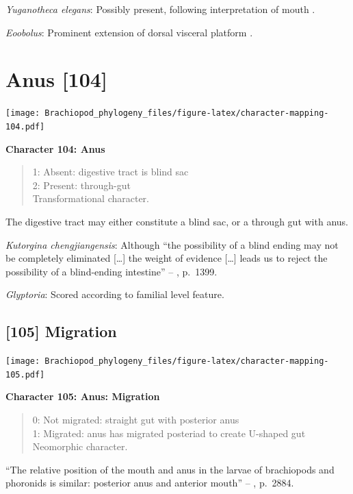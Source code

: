 \documentclass[]{book}
\theoremstyle{definition}
\theoremstyle{definition}
\theoremstyle{definition}
\theoremstyle{remark}
\begin{document}
\emph{Yuganotheca elegans}: Possibly present, following interpretation
of mouth \citep[see fig. 2c, d in][]{Zhang2014Anearly}.

\emph{Eoobolus}: Prominent extension of dorsal visceral platform
\citep{Balthasar2009Thebrachiopod}.

\hypertarget{anus-104}{%
\section{Anus {[}104{]}}\label{anus-104}}

\texttt{[image: Brachiopod\_phylogeny\_files/figure-latex/character-mapping-104.pdf]}

\textbf{Character 104: Anus}

\begin{quote}
1: Absent: digestive tract is blind sac\\
2: Present: through-gut\\
Transformational character.
\end{quote}

The digestive tract may either constitute a blind sac, or a through gut
with anus.

\emph{Kutorgina chengjiangensis}: Although ``the possibility of a blind
ending may not be completely eliminated {[}\ldots{}{]} the weight of
evidence {[}\ldots{}{]} leads us to reject the possibility of a
blind-ending intestine'' --
\citet{Zhang2007Rhynchonelliformeanbrachiopods}, p.~1399.

\emph{Glyptoria}: Scored according to familial level feature.

\hypertarget{migration}{%
\subsection*{{[}105{]} Migration}\label{migration}}

\texttt{[image: Brachiopod\_phylogeny\_files/figure-latex/character-mapping-105.pdf]}

\textbf{Character 105: Anus: Migration}

\begin{quote}
0: Not migrated: straight gut with posterior anus\\
1: Migrated: anus has migrated posteriad to create U-shaped gut\\
Neomorphic character.
\end{quote}

``The relative position of the mouth and anus in the larvae of
brachiopods and phoronids is similar: posterior anus and anterior
mouth'' -- \citet{Williams2007PartH}, p.~2884.
\end{document}
